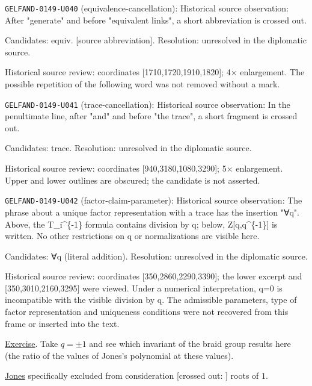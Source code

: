 \noindent\texttt{GELFAND-0149-U040} (equivalence-cancellation): Historical source observation: After "generate" and before "equivalent links", a short abbreviation is crossed out.\par
Candidates: equiv. [source abbreviation]. Resolution: unresolved in the diplomatic source.\par
Historical source review: coordinates [1710,1720,1910,1820]; 4× enlargement. The possible repetition of the following word was not removed without a mark.\par

\noindent\texttt{GELFAND-0149-U041} (trace-cancellation): Historical source observation: In the penultimate line, after "and" and before "the trace", a short fragment is crossed out.\par
Candidates: trace. Resolution: unresolved in the diplomatic source.\par
Historical source review: coordinates [940,3180,1080,3290]; 5× enlargement. Upper and lower outlines are obscured; the candidate is not asserted.\par

\noindent\texttt{GELFAND-0149-U042} (factor-claim-parameter): Historical source observation: The phrase about a unique factor representation with a trace has the insertion "∀q". Above, the T\_i\textasciicircum{}\{-1\} formula contains division by q; below, Z[q,q\textasciicircum{}\{-1\}] is written. No other restrictions on q or normalizations are visible here.\par
Candidates: ∀q (literal addition). Resolution: unresolved in the diplomatic source.\par
Historical source review: coordinates [350,2860,2290,3390]; the lower excerpt and [350,3010,2160,3295] were viewed. Under a numerical interpretation, q=0 is incompatible with the visible division by q. The admissible parameters, type of factor representation and uniqueness conditions were not recovered from this frame or inserted into the text.\par



\underline{Exercise}. Take $q=\pm1$ and see which invariant
of the braid group results here (the ratio of the values of
Jones's polynomial at these values).

\underline{Jones} specifically excluded from consideration
[crossed out: ]
roots of $1$.

